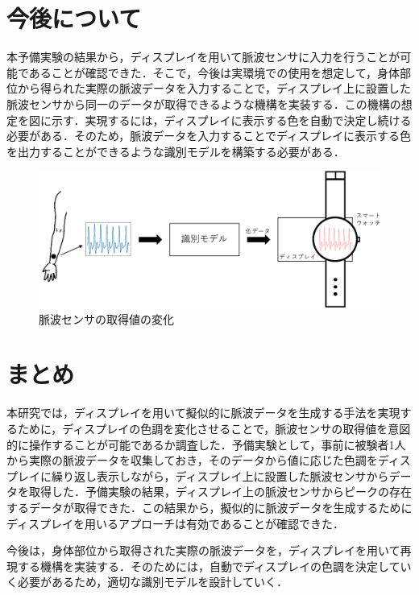 \documentclass[submit,techrep]{ipsj}
\begin{document}
\section{今後について}
\label{future_work}
本予備実験の結果から，ディスプレイを用いて脈波センサに入力を行うことが可能であることが確認できた．そこで，今後は実環境での使用を想定して，身体部位から得られた実際の脈波データを入力することで，ディスプレイ上に設置した脈波センサから同一のデータが取得できるような機構を実装する．この機構の想定を図に示す．実現するには，ディスプレイに表示する色を自動で決定し続ける必要がある．そのため，脈波データを入力することでディスプレイに表示する色を出力することができるような識別モデルを構築する必要がある．

\begin{figure}[!h]
	\begin{center}
		\includegraphics[width=1\linewidth]{future_work.eps}
	\end{center}
	\vspace{-8mm}
	\caption{脈波センサの取得値の変化}
	\label{fig:future_work}
\end{figure}





\section{まとめ}
\label{conclude}
本研究では，ディスプレイを用いて擬似的に脈波データを生成する手法を実現するために，ディスプレイの色調を変化させることで，脈波センサの取得値を意図的に操作することが可能であるか調査した．予備実験として，事前に被験者1人から実際の脈波データを収集しておき，そのデータから値に応じた色調をディスプレイに繰り返し表示しながら，ディスプレイ上に設置した脈波センサからデータを取得した．予備実験の結果，ディスプレイ上の脈波センサからピークの存在するデータが取得できた．この結果から，擬似的に脈波データを生成するためにディスプレイを用いるアプローチは有効であることが確認できた．
\par

今後は，身体部位から取得された実際の脈波データを，ディスプレイを用いて再現する機構を実装する．そのためには，自動でディスプレイの色調を決定していく必要があるため，適切な識別モデルを設計していく．







\end{document}
